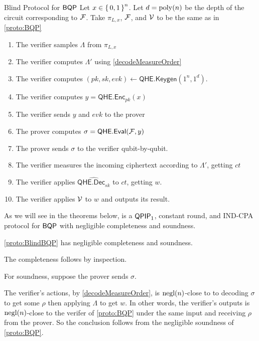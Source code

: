 \begin{protocol}{Blind Protocol for $\operatorname{\mathsf{BQP}}$}
	\label{proto:BlindBQP}
	Let $x\in\set{0,1}^n$.
	Let $d=\operatorname*{\operatorname{poly}}(n)$ be the depth of the circuit corresponding to $\mathcal{F}$.
	Take $\pi_{L, x}$, $\mathcal{F}$, and $\mathcal{V}$ to be the same as in \cref{proto:BQP}
	\begin{enumerate}
		\item The verifier samples $\Lambda$ from $\pi_{L, x}$
		\item The verifier computes $\Lambda'$ using \cref{decodeMeasureOrder}
		\item The verifier computes $(pk, sk, evk)\leftarrow\mathsf{QHE.Keygen}(1^n, 1^d)$.
		\item The verifier computes $y=\mathsf{QHE.Enc}_{pk}(x)$
		\item The verifier sends $y$ and $evk$ to the prover
		\item The prover computes $\sigma=\mathsf{QHE.Eval}(\mathcal{F}, y)$
		\item The prover sends $\sigma$ to the verifier qubit-by-qubit.
		\item The verifier measures the incoming ciphertext according to $\Lambda'$, getting $ct$
		\item The verifier applies $\widehat{\mathsf{QHE.Dec}_{sk}}$ to $ct$, getting $w$.
		\item The verifier applies $\mathcal{V}$ to $w$ and outputs its result.
	\end{enumerate}
\end{protocol}

As we will see in the theorems below,  is a $\operatorname{\mathsf{QPIP}}_1$, constant round, and IND-CPA protocol for $\operatorname{\mathsf{BQP}}$ with negligible completeness and soundness.


\begin{thm}
	\cref{proto:BlindBQP} has negligible completeness and soundness.
\end{thm}
\begin{prf}
	The completeness follows by inspection.

	For soundness, suppose the prover sends $\sigma$.

    
	The verifier's actions, by \cref{decodeMeasureOrder}, is $\operatorname{negl}(n)$-close to to decoding $\sigma$ to get some $\rho$ then applying $\Lambda$ to get $w$.
	In other words, the verifier's outputs is $\operatorname{negl}(n)$-close to the verifer of \cref{proto:BQP} under the same input and receiving $\rho$ from the prover.
	So the conclusion follows from the negligible soundness of \cref{proto:BQP}.
\end{prf}

